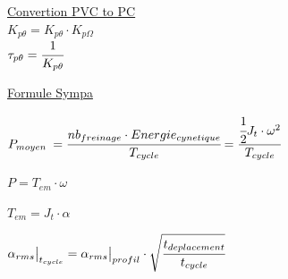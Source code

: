 \documentclass[	DIV=calc,%
							paper=a4,%
							fontsize=10pt,%
							twocolumn]{scrartcl} %
\newcommand{\formtitle}[1]{\large\underline{#1}}
\begin{document}
\formtitle{Convertion PVC to PC }\\

$K_{p\theta} =  K_{p\theta} \cdot K_{p\Omega}$\\


$\tau_{p\theta} =  \cfrac{1}{K_{p\theta}}$

\newpage 

\formtitle{Formule Sympa}

$P_{moyen\;} = \cfrac{nb_{freinage} \cdot Energie_{cynetique}}{T_{cycle}} = \cfrac{\cfrac{1}{2} J_t\cdot \omega^2}{T_{cycle}}$

$P = T_{em} \cdot \omega$

$T_{em} = J_t \cdot \alpha$

$\alpha_{rms}\big|_{t_{cycle}} = \alpha_{rms}\big|_{profil} \cdot \sqrt{\cfrac{t_{deplacement}}{t_{cycle}}}$
\end{document}
